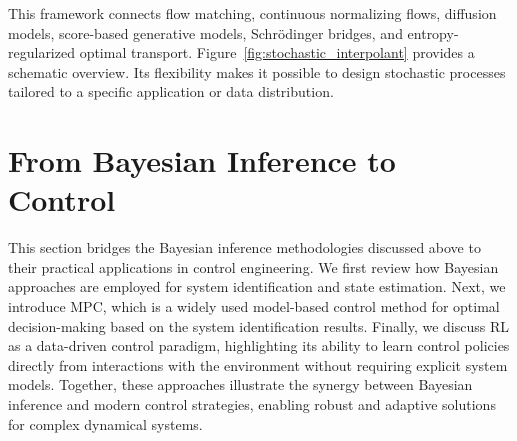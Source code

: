 This framework connects flow matching, continuous normalizing flows, diffusion models, score-based generative models, Schr\"{o}dinger bridges, and entropy-regularized optimal transport. Figure~\ref{fig:stochastic_interpolant} provides a schematic overview. Its flexibility makes it possible to design stochastic processes tailored to a specific application or data distribution.

\section{From Bayesian Inference to Control}
This section bridges the Bayesian inference methodologies discussed above to their practical applications in control engineering. We first review how Bayesian approaches are employed for system identification and state estimation. Next, we introduce \acf{MPC}, which is a widely used model-based control method for optimal decision-making based on the system identification results. Finally, we discuss \acf{RL} as a data-driven control paradigm, highlighting its ability to learn control policies directly from interactions with the environment without requiring explicit system models. Together, these approaches illustrate the synergy between Bayesian inference and modern control strategies, enabling robust and adaptive solutions for complex dynamical systems.

